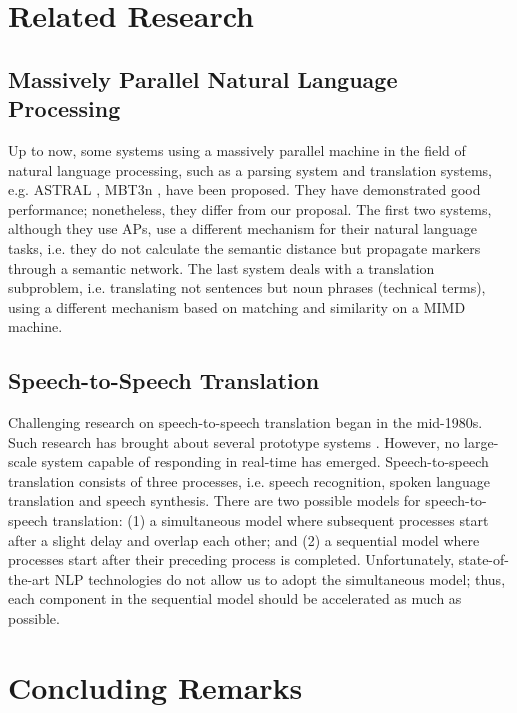 \section{Related Research}\label{sec-related}

\subsection{Massively Parallel Natural Language Processing}
 Up to now, some systems using a massively parallel machine in the
field of natural language processing, such as a parsing system
\cite{Kitano91b} and translation systems, e.g.  
ASTRAL \cite{Kitano91a}, MBT3n \cite{Sato93b}, have
been proposed. 
 They have demonstrated good performance; nonetheless,
they differ from our proposal.
The first two systems, although they use APs, 
use a different mechanism for their natural language tasks, i.e. 
they do not calculate the semantic distance
but propagate markers through a semantic network.
The last system deals with a translation subproblem, i.e.  translating 
not sentences but noun phrases (technical terms),
using a different mechanism based on matching and similarity
on a MIMD machine.

\subsection{Speech-to-Speech Translation}

Challenging research on speech-to-speech translation began in the mid-1980s.
 Such research has brought about several prototype systems
\cite{Morimoto93,Kitano91d,Waibel91,Rayner93,HatazakiE92}.
However, no large-scale system capable of  responding
in real-time has emerged.
 Speech-to-speech translation consists of three processes,
i.e.  speech recognition, spoken language translation and speech
synthesis. 
There are two possible models for  speech-to-speech translation:
(1) a simultaneous model where subsequent processes start after a slight 
delay and 
overlap each other; and (2) a 
sequential model where processes start after their 
preceding process is completed. 
Unfortunately, state-of-the-art NLP technologies do not
allow us to adopt the  simultaneous model; thus, each component in the 
sequential 
model should be accelerated as much as possible.

\section{Concluding Remarks}

